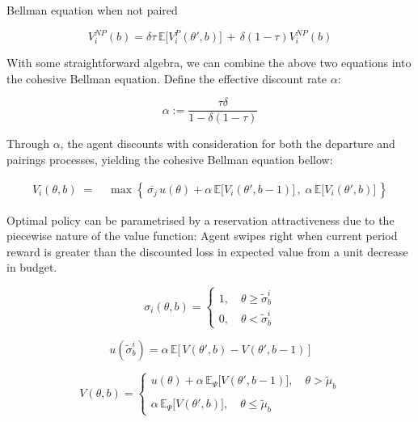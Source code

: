 Bellman equation when not paired

\begin{equation} 
        V^{NP}_i(b) = \delta \tau \,\mathbb{E}\Big[ V^P_i(\theta', b)\Big] \,+\, \delta (1-\tau) V^{NP}_i(b) 
\end{equation}

With some straightforward algebra, we can combine the above two equations into the cohesive Bellman equation. Define the effective discount rate $\alpha$: 

$$
\alpha:=\frac{\tau\delta}{1-\delta(1-\tau)}
$$

Through $\alpha$, the agent discounts with consideration for both the departure and pairings processes, yielding the cohesive Bellman equation bellow:

\begin{equation}
    \begin{aligned} 
        V_i(\theta,b) \;=\;&\max\left\{\,\overline{\sigma_j} \, u(\theta) +\alpha \,\mathbb{E}\Big[V_i(\theta', b-1)\Big]\,,\; \alpha\,\mathbb{E}\Big[ V_i(\theta', b)\Big]\,\right\} 
    \end{aligned}
\end{equation}

Optimal policy can be parametrised by a reservation attractiveness due to the piecewise nature of the value function: Agent swipes right when current period reward is greater than the discounted loss in expected value from a unit decrease in budget.

\begin{equation}
    \sigma_i(\theta,b)=\begin{cases}
        1,\quad \theta\geq \widetilde{\sigma}^i_b \\ 
        0, \quad\theta< \widetilde\sigma^i_b  
    \end{cases}
\end{equation}

\begin{equation}
    u(\widetilde\sigma^i_b) = \alpha \, \mathbb{E}\Big[\,V(\theta',b)-V(\theta',b-1)\,\Big]  
\end{equation}

\begin{equation}
    V(\theta, b)=\begin{cases} 
        u(\theta) +\alpha \,\mathbb{E}_{\Psi}\Big[V(\theta', b-1)\Big],\quad \theta> \widetilde \mu_b \\\\ 
        \alpha \,\mathbb{E}_{\Psi}\Big[V(\theta', b)\Big],\quad \theta\leq\widetilde \mu_b
    \end{cases}  
\end{equation}

